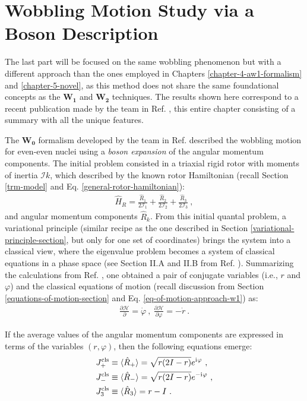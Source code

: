 \chapter{Wobbling Motion Study via a Boson Description}
\label{extra-chapter-new-boson}

The last part will be focused on the same wobbling phenomenon but with a different approach than the ones employed in Chapters \ref{chapter-4-aw1-formalism} and \ref{chapter-5-novel}, as this method does not share the same foundational concepts as the $\mathbf{W_1}$ and $\mathbf{W_2}$ techniques. The results shown here correspond to a recent publication made by the team in Ref. \cite{raduta2020new}, this entire chapter consisting of a summary with all the unique features.

The $\mathbf{W_0}$ formalism developed by the team in Ref. \cite{raduta2017semiclassical} described the wobbling motion for even-even nuclei using a \emph{boson expansion} of the angular momentum components. The initial problem consisted in a triaxial rigid rotor with moments of inertia $\mathcal{I}k$, which described by the known rotor Hamiltonian (recall Section \ref{trm-model} and Eq. \ref{general-rotor-hamiltonian}):
\begin{align}
    \hat{H}_R=\frac{\hat{R}_1}{2\mathcal{I}_1}+\frac{\hat{R}_2}{2\mathcal{I}_2}+\frac{\hat{R}_3}{2\mathcal{I}_3}\ ,
\end{align}
and angular momentum components $\hat{R}_k$. From this initial quantal problem, a variational principle (similar recipe as the one described in Section \ref{variational-principle-section}, but only for one set of coordinates) brings the system into a classical view, where the eigenvalue problem becomes a system of classical equations in a phase space (see Section II.A and II.B from Ref. \cite{raduta2017semiclassical}). Summarizing the calculations from Ref. \cite{raduta2017semiclassical}, one obtained a pair of conjugate variables (i.e., $r$ and$\varphi$) and the classical equations of motion (recall discussion from Section \ref{equations-of-motion-section} and Eq. \ref{eq-of-motion-approach-w1}) as:
\begin{align}
    \frac{\partial\mathcal{H}}{\partial}=\dot{\varphi}\ ,\ \frac{\partial\mathcal{H}}{\partial\varphi}=-\dot{r}\ .
\end{align}

If the average values of the angular momentum components are expressed in terms of the variables $(r,\varphi)$, then the following equations emerge:
\begin{align}
    J_+^\text{cls}&\equiv\langle\hat{R}_+\rangle=\sqrt{r(2I-r)}e^{\iu\varphi}\ ,\nonumber \\
    J_-^\text{cls}&\equiv\langle\hat{R}_-\rangle=\sqrt{r(2I-r)}e^{-\iu\varphi}\ ,\nonumber \\
    J_3^\text{cls}&\equiv\langle\hat{R}_3\rangle=r-I\ .
    \label{classical-am-components-boson}
\end{align} 

